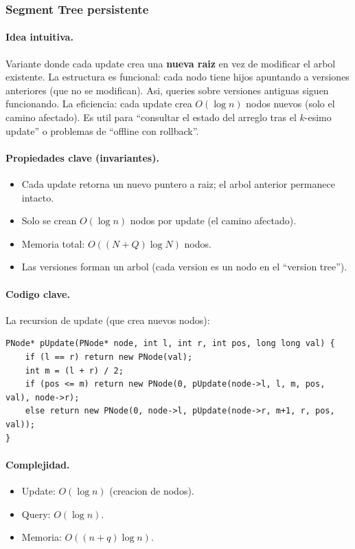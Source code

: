 \subsubsection{Segment Tree persistente}

\paragraph{Idea intuitiva.}
Variante donde cada update crea una \textbf{nueva raiz} en vez de modificar el arbol existente. La estructura es funcional: cada nodo tiene hijos apuntando a versiones anteriores (que no se modifican). Asi, queries sobre versiones antiguas siguen funcionando. La eficiencia: cada update crea $O(\log n)$ nodos nuevos (solo el camino afectado). Es util para ``consultar el estado del arreglo tras el $k$-esimo update'' o problemas de ``offline con rollback''.

\paragraph{Propiedades clave (invariantes).}
\begin{itemize}\setlength\itemsep{0pt}
	\item Cada update retorna un nuevo puntero a raiz; el arbol anterior permanece intacto.
	\item Solo se crean $O(\log n)$ nodos por update (el camino afectado).
	\item Memoria total: $O((N + Q) \log N)$ nodos.
	\item Las versiones forman un arbol (cada version es un nodo en el ``version tree'').
\end{itemize}

\paragraph{Codigo clave.}
La recursion de update (que crea nuevos nodos):
\begin{verbatim}
PNode* pUpdate(PNode* node, int l, int r, int pos, long long val) {
    if (l == r) return new PNode(val);
    int m = (l + r) / 2;
    if (pos <= m) return new PNode(0, pUpdate(node->l, l, m, pos, val), node->r);
    else return new PNode(0, node->l, pUpdate(node->r, m+1, r, pos, val));
}
\end{verbatim}

\paragraph{Complejidad.}
\begin{itemize}\setlength\itemsep{0pt}
	\item Update: $O(\log n)$ (creacion de nodos).
	\item Query: $O(\log n)$.
	\item Memoria: $O((n + q) \log n)$.
\end{itemize}

